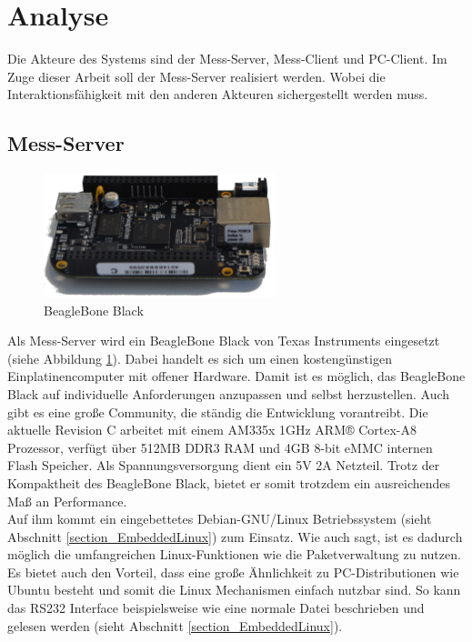 \section{Analyse}

Die Akteure des Systems sind der Mess-Server, Mess-Client und PC-Client. Im Zuge dieser Arbeit soll der Mess-Server realisiert werden. Wobei die Interaktionsfähigkeit mit den anderen Akteuren sichergestellt werden muss.


\subsection{Mess-Server}
\label{section_Mess-Server}

\begin{figure}[H]
\begin{center}
\includegraphics[width=0.6\textwidth]{img/general/BeagleBoneBlack.png}
\caption{BeagleBone Black}
\label{figure_Beagleboneblack}
\end{center}
\end{figure}


Als Mess-Server wird ein BeagleBone Black von Texas Instruments eingesetzt (siehe Abbildung \ref{figure_Beagleboneblack}). Dabei handelt es sich um einen kostengünstigen Einplatinencomputer mit offener Hardware. Damit ist es möglich, das BeagleBone Black auf individuelle Anforderungen anzupassen und selbst herzustellen. Auch gibt es eine große Community, die ständig die Entwicklung vorantreibt.
Die aktuelle Revision C arbeitet mit einem AM335x 1GHz ARM® Cortex-A8 Prozessor, verfügt über 512MB DDR3 RAM und 4GB 8-bit eMMC internen Flash Speicher. Als Spannungsversorgung dient ein 5V 2A Netzteil. Trotz der Kompaktheit des BeagleBone Black, bietet er somit trotzdem ein ausreichendes Maß an Performance.\\
Auf ihm kommt ein eingebettetes Debian-GNU/Linux Betriebssystem (sieht Abschnitt \ref{section_EmbeddedLinux}) zum Einsatz. Wie auch \cite{schroeder2009embedded} sagt, ist es dadurch möglich die umfangreichen Linux-Funktionen wie die Paketverwaltung zu nutzen. Es bietet auch den Vorteil, dass eine große Ähnlichkeit zu PC-Distributionen wie Ubuntu besteht und somit die Linux Mechanismen einfach nutzbar sind. So kann das RS232 Interface beispielsweise wie eine normale Datei beschrieben und gelesen werden (sieht Abschnitt \ref{section_EmbeddedLinux}).

